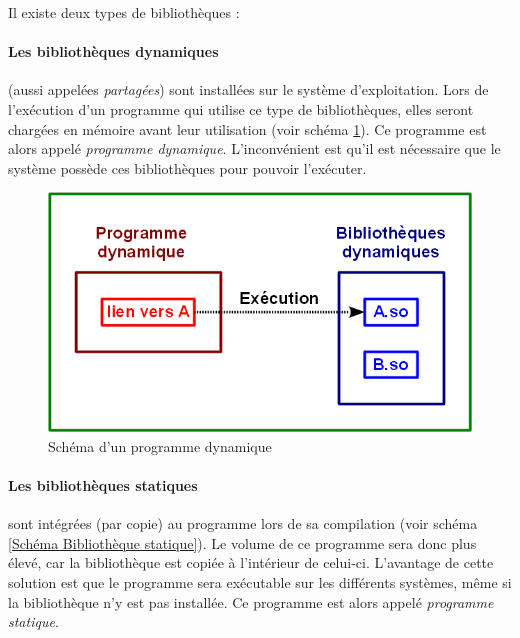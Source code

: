 Il existe deux types de bibliothèques :

\paragraph{Les bibliothèques dynamiques}
(aussi appelées \textit{partagées}) sont installées sur le système d'exploitation.
Lors de l'exécution d'un programme qui utilise ce type de bibliothèques, elles seront chargées en mémoire avant leur utilisation (voir schéma \ref{Schéma Bibliothèque dynamique}).
Ce programme est alors appelé \textit{programme dynamique}.
L'inconvénient est qu'il est nécessaire que le système possède ces bibliothèques pour pouvoir l'exécuter.

\begin{figure}[!h]
	\center
	\includegraphics[scale=0.5]{images/Bibliotheque_dynamique.png}
	\caption{Schéma d'un programme dynamique}
	\label{Schéma Bibliothèque dynamique}
\end{figure}


\paragraph{Les bibliothèques statiques}
sont intégrées (par copie) au programme lors de sa compilation (voir schéma \ref{Schéma Bibliothèque statique}).
Le volume de ce programme sera donc plus élevé, car la bibliothèque est copiée à l'intérieur de celui-ci.
L'avantage de cette solution est que le programme sera exécutable sur les différents systèmes, même si la bibliothèque n'y est pas installée.
Ce programme est alors appelé \textit{programme statique}.

